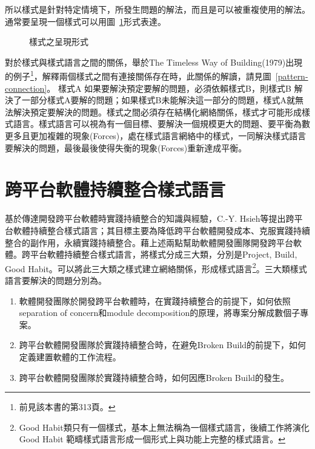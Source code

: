 所以樣式是針對特定情境下，所發生問題的解法，而且是可以被重複使用的解法。通常要呈現一個樣式可以用圖~\ref{patternformat}形式表達。
\begin{figure}
\caption{樣式之呈現形式}
\label{patternformat}
\end{figure}
對於樣式與樣式語言之間的關係，舉於The Timeless Way of Building(1979)\cite{thetimelesswayofbuilding}出現的例子\footnote{前見該本書的第313頁。}，解釋兩個樣式之間有連接關係存在時，此關係的解讀，請見圖~\ref{pattern-connection}。
樣式A 如果要解決預定要解的問題，必須依賴樣式B，則樣式B 解決了一部分樣式A要解的問題；如果樣式B未能解決這一部分的問題，樣式A就無法解決預定要解決的問題。樣式之間必須存在結構化網絡關係，樣式才可能形成樣式語言。樣式語言可以視為有一個目標、要解決一個規模更大的問題、要平衡為數更多且更加複雜的現象(Forces)，處在樣式語言網絡中的樣式，一同解決樣式語言要解決的問題，最後最後使得失衡的現象(Forces)重新達成平衡。
 
\section{跨平台軟體持續整合樣式語言}

基於傳達開發跨平台軟體時實踐持續整合的知識與經驗，C.-Y. Hsieh等提出跨平台軟體持續整合樣式語言；其目標主要為降低跨平台軟體開發成本、克服實踐持續整合的副作用，永續實踐持續整合。藉上述兩點幫助軟體開發團隊開發跨平台軟體。跨平台軟體持續整合樣式語言，將樣式分成三大類，分別是Project, Build, Good Habit。可以將此三大類之樣式建立網絡關係，形成樣式語言\footnote{Good Habit類只有一個樣式，基本上無法稱為一個樣式語言，後續工作將演化Good Habit 範疇樣式語言形成一個形式上與功能上完整的樣式語言。}。三大類樣式語言要解決的問題分別為。
\begin{enumerate}
\item 軟體開發團隊於開發跨平台軟體時，在實踐持續整合的前提下，如何依照separation of concern和module decomposition的原理\cite{satextbook}，將專案分解成數個子專案。
\item 跨平台軟體開發團隊於實踐持續整合時，在避免Broken Build的前提下，如何定義建置軟體的工作流程。
\item 跨平台軟體開發團隊於實踐持續整合時，如何因應Broken Build的發生。
\end{enumerate}

